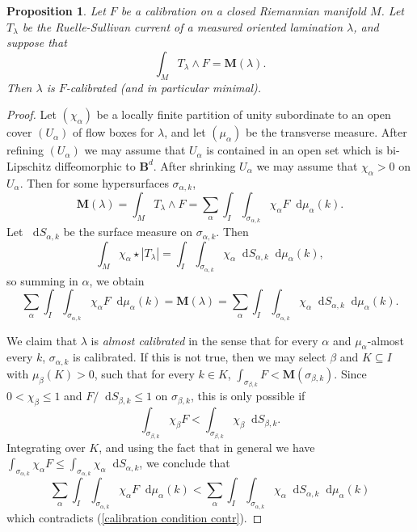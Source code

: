 \documentclass[reqno,11pt]{amsart}
\newcommand{\Ball}{\mathbf{B}}
\newcommand*\dif{\mathop{}\!\mathrm{d}}
\newcommand{\Mass}{\mathbf M}
\newcommand{\dfn}[1]{\emph{#1}\index{#1}}
\newtheorem{proposition}[theorem]{Proposition}
\theoremstyle{definition}
\numberwithin{equation}{section}
\begin{document}
\begin{proposition}\label{calibration condition}
Let $F$ be a calibration on a closed Riemannian manifold $M$.
Let $T_\lambda$ be the Ruelle-Sullivan current of a measured oriented lamination $\lambda$, and suppose that 
\begin{equation}\label{calibration by Ruelle Sullivan}
\int_M T_\lambda \wedge F = \Mass(\lambda).
\end{equation}
Then $\lambda$ is $F$-calibrated (and in particular minimal).
\end{proposition}
\begin{proof}
Let $(\chi_\alpha)$ be a locally finite partition of unity subordinate to an open cover $(U_\alpha)$ of flow boxes for $\lambda$, and let $(\mu_\alpha)$ be the transverse measure.
After refining $(U_\alpha)$ we may assume that $U_\alpha$ is contained in an open set which is bi-Lipschitz diffeomorphic to $\Ball^d$. After shrinking $U_\alpha$ we may assume that $\chi_\alpha > 0$ on $U_\alpha$.
Then for some hypersurfaces $\sigma_{\alpha,k}$,
$$\Mass(\lambda) = \int_M T_\lambda \wedge F = \sum_\alpha \int_I \int_{\sigma_{\alpha,k}} \chi_\alpha F \dif \mu_\alpha(k).$$
Let $\dif S_{\alpha,k}$ be the surface measure on $\sigma_{\alpha,k}$. Then
$$\int_M \chi_\alpha \star |T_\lambda| = \int_I \int_{\sigma_{\alpha,k}} \chi_\alpha \dif S_{\alpha,k} \dif \mu_\alpha(k),$$
so summing in $\alpha$, we obtain 
\begin{equation}\label{calibration condition contr}
\sum_\alpha \int_I \int_{\sigma_{\alpha,k}} \chi_\alpha F \dif \mu_\alpha(k) = \Mass(\lambda) = \sum_\alpha \int_I \int_{\sigma_{\alpha,k}} \chi_\alpha \dif S_{\alpha,k} \dif \mu_\alpha(k).
\end{equation}

We claim that $\lambda$ is \dfn{almost calibrated} in the sense that for every $\alpha$ and $\mu_\alpha$-almost every $k$, $\sigma_{\alpha, k}$ is calibrated.
If this is not true, then we may select $\beta$ and $K \subseteq I$ with $\mu_\beta(K) > 0$, such that for every $k \in K$, $\int_{\sigma_{\beta, k}} F < \Mass(\sigma_{\beta, k})$.
Since $0 < \chi_\beta \leq 1$ and $F/\dif S_{\beta, k} \leq 1$ on $\sigma_{\beta, k}$, this is only possible if 
$$\int_{\sigma_{\beta, k}} \chi_\beta F < \int_{\sigma_{\beta, k}} \chi_\beta \dif S_{\beta, k}.$$
Integrating over $K$, and using the fact that in general we have $\int_{\sigma_{\alpha, k}} \chi_\alpha F \leq \int_{\sigma_{\alpha, k}} \chi_\alpha \dif S_{\alpha, k}$, we conclude that 
$$\sum_\alpha \int_I \int_{\sigma_{\alpha, k}} \chi_\alpha F \dif \mu_\alpha(k) < \sum_\alpha \int_I \int_{\sigma_{\alpha, k}} \chi_\alpha \dif S_{\alpha, k} \dif \mu_\alpha(k)$$
which contradicts (\ref{calibration condition contr}).


\end{proof}
\end{document}
